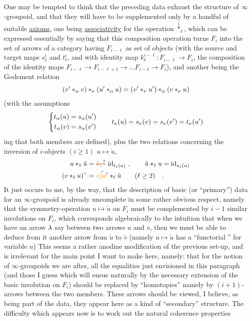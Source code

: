 One may be tempted to think that the preceding data exhaust the structure of $\infty$-groupoid, and that they will have to be supplemented only by a handful of suitable \uline{axioms}, one being \uline{associativity} for the operation $\overset{i}{*}_\ell$, which can be expressed essentially by saying that this composition operation turns $F_i$ into the set of arrows of a category having $F_{i-\ell}$ as set of objects (with the source and target maps $s^i_\ell$ and $t^i_\ell$, and with identity map $k_\ell^{i-\ell}:F_{i-\ell}\longrightarrow F_i$, the composition of the identity maps $F_{i-\ell}\longrightarrow F_{i-\ell+1}\longrightarrow\ldots F_{i-1}\longrightarrow F_i$), and another being the Godement relation
\[
(v' *_{\alpha}v)*_{\nu}(u'*_{\alpha}u)
=(v'*_{\nu}u')*_{\alpha}(v*_{\nu}u)
\]
(with the assumptions \handwritten{$1\leq\alpha<\nu$,}  
\[
\left\{\begin{aligned}t_\alpha(u)&=s_\alpha(u')\\t_\alpha(v)&=s_\alpha(v')\end{aligned}\right. \qquad
t_\nu(u)=s_\nu(v)=s_\nu(v')=t_\nu(u')
\]
ing that both members are defined), plus the two relations concerning the inversion of $i$-objects $(i\geq1)$ $u\mapsto\check{u}$,
\[
\begin{aligned}
u*_1\check{u}&=\deleted{\unsure{k_1}}\ \mathrm{id}_{t_1(u)}\ ,\qquad \check{u}*_1u=\mathrm{id}_{s_1(u)}\\
{(v*_\ell u)}^{\scriptscriptstyle\vee}&=\check{\unsure{v|u}}*_\ell\check{u}\qquad(\ell\geq2)\quad.
\end{aligned}
\]
It just occurs to me, by the way, that the  description of basic (or ``primary'') data for an $\infty$-groupoid is already uncomplete in some rather obvious respect, namely that the symmetry-operation  $u\mapsto\check{u}$ on $F_i$ must be complemented by $i-1$ similar involutions on $F_i$, which corresponds algebraically to the intuition that when we have an arrow $\lambda$ say between two arrows $u$ and $v$, then we must be able to deduce from it another arrow from $\check{u}$ to $\check{v}$ (namely $u\mapsto\check{u}$ has a ``functorial ''  for variable $u$) This seems a rather anodine modification of the previous set-up, and is irrelevant for the main point I want to make here, namely: that for the notion of $\infty$-groupoids we are after, all the equalities just envisioned in this paragraph (and those I guess which will ensue naturally by the necessary extension of the basic involution on $F_i$) should be replaced by ``homotopies'' namely by $(i+1)$-arrows between the two members. These arrows should be viewed, I believe, as being part of the data,   they appear here as a kind of ``secondary'' structure. The difficulty which appears now is to work out the natural coherence properties
